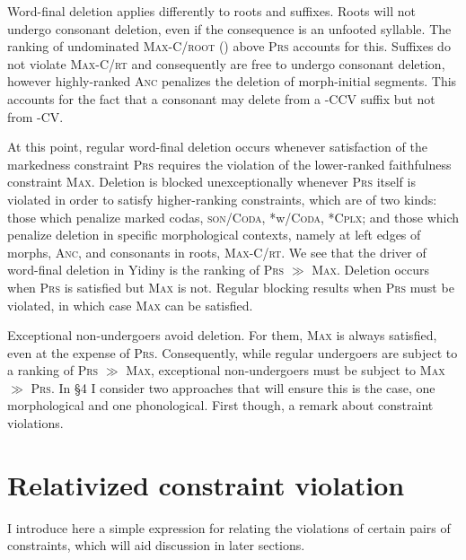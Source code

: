 \documentclass[output=paper,
modfonts
]{LSP/langsci}
\begin{document}
Word-final deletion applies differently to roots and suffixes. Roots will not undergo consonant deletion, even if the consequence is an unfooted syllable. The ranking of undominated \textsc{Max-C/root} (\citealt{mccarthy1995r}) above \textsc{Prs} accounts for this. Suffixes do not violate \textsc{Max-C/rt} and consequently are free to undergo consonant deletion, however highly-ranked \textsc{Anc} penalizes the deletion of morph-initial segments. This accounts for the fact that a consonant may delete from a -CCV suffix but not from -CV.

At this point, regular word-final deletion occurs whenever satisfaction of the markedness constraint \textsc{Prs} requires the violation of the lower-ranked faithfulness constraint \textsc{Max}. Deletion is blocked unexceptionally whenever \textsc{Prs} itself is violated in order to satisfy higher-ranking constraints, which are of two kinds: those which penalize marked codas, \textsc{son/Coda}, *w\textsc{/Coda,} *\textsc{Cplx}; and those which penalize deletion in specific morphological contexts, namely at left edges of morphs, \textsc{Anc}, and consonants in roots, \textsc{Max-C/rt}. We see that the driver of word-final deletion in Yidiny is the ranking of \textsc{Prs} ${\gg}$ \textsc{Max.} Deletion occurs when \textsc{Prs} is satisfied but \textsc{Max} is not. Regular blocking results when \textsc{Prs} must be violated, in which case \textsc{Max} can be satisfied.

Exceptional non-undergoers avoid deletion. For them, \textsc{Max} is always satisfied, even at the expense of \textsc{Prs}. Consequently, while regular undergoers are subject to a  ranking of \textsc{Prs} ${\gg}$ \textsc{Max,} exceptional non-undergoers must be subject to \textsc{Max} ${\gg}$ \textsc{Prs.} In §4 I consider two approaches that will ensure this is the case, one morphological and one phonological. First though, a remark about constraint violations.

\section[Relativized constraint violation]{Relativized constraint violation}

I introduce here a simple expression for relating the violations of certain pairs of constraints, which will aid discussion in later sections.
\end{document}
